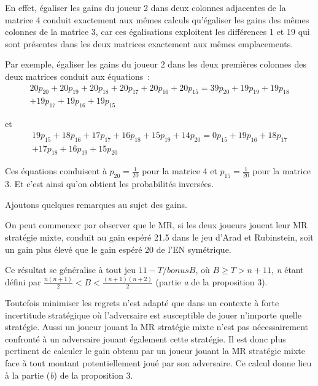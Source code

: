 \begin{Article}
\begin{refsection}[UmbhauerFR]
En effet, égaliser les gains du joueur 2 dans deux colonnes adjacentes
de la matrice 4 conduit exactement aux mêmes calculs qu'égaliser les
gains des mêmes colonnes de la matrice 3, car ces égalisations
exploitent les différences 1 et 19 qui sont présentes dans les deux
matrices exactement aux mêmes emplacements.

Par exemple, égaliser les gains du joueur 2 dans les deux premières
colonnes des deux matrices conduit aux équations~:
\begin{equation*}
\begin{split}
  20p_{20} + 20p_{19} + 20p_{18} + 20p_{17} + 20p_{16} + 20p_{15} = 39p_{20} + 19p_{19} + 19p_{18}\\ + 19p_{17} + 19p_{16} + 19p_{15}  
\end{split}
\end{equation*}

\noindent {} et
\begin{equation*}
\begin{split}
    19p_{15} + 18p_{16} + 17p_{17} + 16p_{18} + 15p_{19} + 14p_{20} = 0p_{15} + 19p_{16} + 18p_{17}\\ + 17p_{18} + 16p_{19} + 15p_{20}
\end{split}
\end{equation*}

\noindent {}

Ces équations conduisent à \(p_{20} = \frac{1}{20}\) pour la matrice 4
et \(p_{15} = \frac{1}{20}\) pour la matrice 3. Et c'est ainsi qu'on
obtient les probabilités inversées.

Ajoutons quelques remarques au sujet des gains.

On peut commencer par observer que le MR, si les deux joueurs jouent
leur MR stratégie mixte, conduit au gain espéré 21.5 dans le jeu d'Arad
et Rubinstein, soit un gain plus élevé que le gain espéré 20 de l'EN
symétrique.

Ce résultat se généralise à tout jeu \(11 - T/bonusB\), où
\(B \geq T > n + 11\), \emph{n} étant défini par
\(\frac{n(n + 1)}{2} < B < \frac{(n + 1)(n + 2)}{2}\) (partie \emph{a}
de la proposition 3).

Toutefois minimiser les regrets n'est adapté que dans un contexte à
forte incertitude stratégique où l'adversaire est susceptible de jouer
n'importe quelle stratégie. Aussi un joueur jouant la MR stratégie mixte
n'est pas nécessairement confronté à un adversaire jouant également
cette stratégie. Il est donc plus pertinent de calculer le gain obtenu
par un joueur jouant la MR stratégie mixte face à tout montant
potentiellement joué par son adversaire. Ce calcul donne lieu à la
partie (\emph{b}) de la proposition 3.


\end{refsection}
\end{Article}
